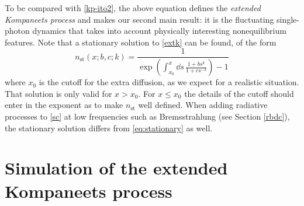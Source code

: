 \documentclass[a4paper,12pt,reqno,superscriptaddress,nofootinbib]{revtex4}
\theoremstyle{plain}
\theoremstyle{definition}
\theoremstyle{remark}
\newcommand{\0}{^{(0)}}
\newcommand{\1}{^{(1)}}
\newcommand{\2}{^{(2)}}
\begin{document}
To be compared with \eqref{kp-ito2}, the above equation defines the \textit{extended Kompaneets process} and makes our second main result: it is the fluctuating single-photon dynamics that takes into account physically interesting nonequilibrium features.  Note that a stationary solution to \eqref{extk} can be found, of the form
\begin{equation}\label{eq:stationary}
n_\text{st}(x;b,c;k) = \frac{1}{\exp\left(\int_{x_0}^x \dd s \, \frac{1+bs^k}{1+cs^{-3}}\right) - 1} 
\end{equation}
where $x_0$ is the cutoff for the extra diffusion, as we expect for a realistic situation. That solution is only valid for $x>x_0$. For $x\leq x_0$ the details of the cutoff should enter in the exponent as to make $n_\text{st}$ well defined. When adding radiative processes to \eqref{sc} at low frequencies such as Bremsstrahlung (see Section \ref{rbdc}), the stationary solution differs from \eqref{eq:stationary} as well.


%
%
%
%




\section{Simulation of the extended Kompaneets process}\label{simex}
\end{document}
